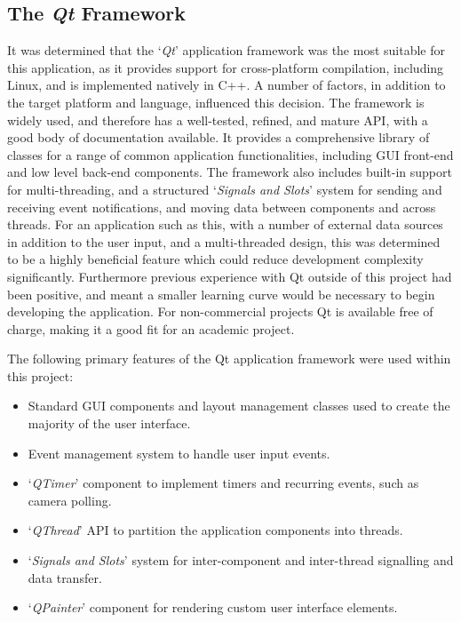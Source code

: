 \subsection{The \textit{Qt} Framework}
It was determined that the `\textit{Qt}' application framework was the most suitable for this application, as it provides support for cross-platform compilation, including Linux, and is implemented natively in C++. A number of factors, in addition to the target platform and language, influenced this decision. The framework is widely used, and therefore has a well-tested, refined, and mature API, with a good body of documentation available. It provides a comprehensive library of classes for a range of common application functionalities, including GUI front-end and low level back-end components. The framework also includes built-in support for multi-threading, and a structured `\textit{Signals and Slots}' system for sending and receiving event notifications, and moving data between components and across threads. For an application such as this, with a number of external data sources in addition to the user input, and a multi-threaded design, this was determined to be a highly beneficial feature which could reduce development complexity significantly. Furthermore previous experience with Qt outside of this project had been positive, and meant a smaller learning curve would be necessary to begin developing the application. For non-commercial projects Qt is available free of charge, making it a good fit for an academic project.

The following primary features of the Qt application framework were used within this project:

\begin{itemize}
 \item Standard GUI components and layout management classes used to create the majority of the user interface.
 \item Event management system to handle user input events.
 \item `\textit{QTimer}' component to implement timers and recurring events, such as camera polling.
 \item `\textit{QThread}' API to partition the application components into threads.
 \item `\textit{Signals and Slots}' system for inter-component and inter-thread signalling and data transfer.
 \item `\textit{QPainter}' component for rendering custom user interface elements.
\end{itemize}

